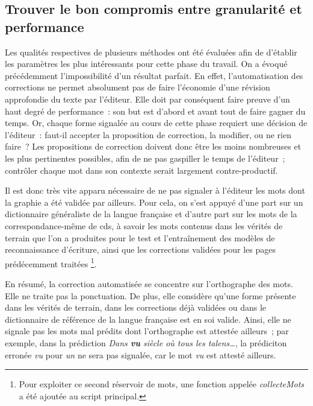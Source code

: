 \documentclass[a4paper,12pt,twoside]{book}
\begin{document}
			\subsection{Trouver le bon compromis entre granularité et performance}
				Les qualités respectives de plusieurs méthodes ont été évaluées afin de d'établir les paramètres les plus intéressants pour cette phase du travail. On a évoqué précédemment l'impossibilité d'un résultat parfait. En effet, l'automatisation des corrections ne permet absolument pas de faire l'économie d'une révision approfondie du texte par l'éditeur. Elle doit par conséquent faire preuve d'un haut degré de performance~: son but est d'abord et avant tout de faire gagner du temps. Or, chaque forme signalée au cours de cette phase requiert une décision de l'éditeur~: faut-il accepter la proposition de correction, la modifier, ou ne rien faire~? Les propositions de correction doivent donc être les moins nombreuses et les plus pertinentes possibles, afin de ne pas gaspiller le temps de l'éditeur~; contrôler chaque mot dans son contexte serait largement contre-productif.
				
				Il est donc très vite apparu nécessaire de ne pas signaler à l'éditeur les mots dont la graphie a été validée par ailleurs. Pour cela, on s'est appuyé d'une part sur un dictionnaire généraliste de la langue française et d'autre part sur les mots de la correspondance-même de \gls{cds}, à savoir les mots contenus dans les vérités de terrain que l'on a produites pour le test et l'entraînement des modèles de reconnaissance d'écriture, ainsi que les corrections validées pour les pages prédécemment traitées 
				\footnote{Pour exploiter ce second réservoir de mots, une fonction appelée \textit{collecteMots} a été ajoutée au script principal.}.
			
				En résumé, la correction automatisée se concentre sur l'orthographe des mots. Elle ne traite pas la ponctuation. De plus, elle considère qu'une forme présente dans les vérités de terrain, dans les corrections déjà validées ou dans le dictionnaire de référence de la langue française est en soi valide. Ainsi, elle ne signale pas les mots mal prédits dont l'orthographe est attestée ailleurs~; par exemple, dans la \gls{prédiction} \textit{Dans \textbf{vu} siècle où tous les talens…}, la prédiciton erronée \textit{vu} pour \textit{un} ne sera pas signalée, car le mot \textit{vu} est attesté ailleurs.
					
\end{document}
